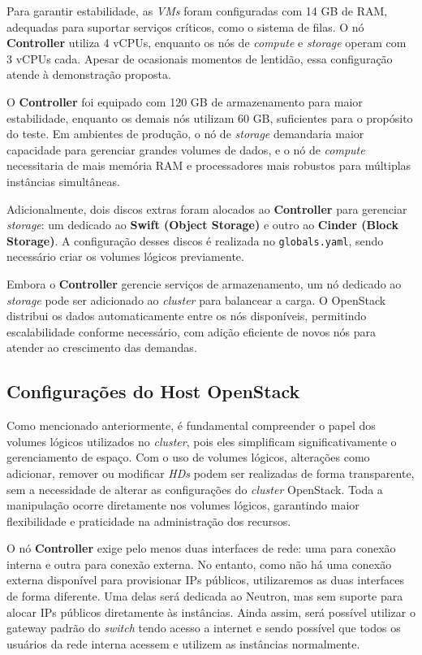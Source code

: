 Para garantir estabilidade, as \textit{VMs} foram configuradas com 14 GB de RAM, adequadas para suportar serviços críticos, como o sistema de filas. O nó \textbf{Controller} utiliza 4 vCPUs, enquanto os nós de \textit{compute} e \textit{storage} operam com 3 vCPUs cada. Apesar de ocasionais momentos de lentidão, essa configuração atende à demonstração proposta.

O \textbf{Controller} foi equipado com 120 GB de armazenamento para maior estabilidade, enquanto os demais nós utilizam 60 GB, suficientes para o propósito do teste. Em ambientes de produção, o nó de \textit{storage} demandaria maior capacidade para gerenciar grandes volumes de dados, e o nó de \textit{compute} necessitaria de mais memória RAM e processadores mais robustos para múltiplas instâncias simultâneas.

Adicionalmente, dois discos extras foram alocados ao \textbf{Controller} para gerenciar \textit{storage}: um dedicado ao \textbf{Swift (Object Storage)} e outro ao \textbf{Cinder (Block Storage)}. A configuração desses discos é realizada no \texttt{globals.yaml}, sendo necessário criar os volumes lógicos previamente.

Embora o \textbf{Controller} gerencie serviços de armazenamento, um nó dedicado ao \textit{storage} pode ser adicionado ao \textit{cluster} para balancear a carga. O OpenStack distribui os dados automaticamente entre os nós disponíveis, permitindo escalabilidade conforme necessário, com adição eficiente de novos nós para atender ao crescimento das demandas.




\subsection{Configurações do Host OpenStack}

Como mencionado anteriormente, é fundamental compreender o papel dos volumes lógicos utilizados no \textit{cluster}, pois eles simplificam significativamente o gerenciamento de espaço. Com o uso de volumes lógicos, alterações como adicionar, remover ou modificar \textit{HDs} podem ser realizadas de forma transparente, sem a necessidade de alterar as configurações do \textit{cluster} OpenStack. Toda a manipulação ocorre diretamente nos volumes lógicos, garantindo maior flexibilidade e praticidade na administração dos recursos.

O nó \textbf{Controller} exige pelo menos duas interfaces de rede: uma para conexão interna e outra para conexão externa. No entanto, como não há uma conexão externa disponível para provisionar IPs públicos, utilizaremos as duas interfaces de forma diferente. Uma delas será dedicada ao Neutron, mas sem suporte para alocar IPs públicos diretamente às instâncias. Ainda assim, será possível utilizar o gateway padrão do \textit{switch} tendo acesso a internet e sendo possível que todos os usuários da rede interna acessem e utilizem as instâncias normalmente.

